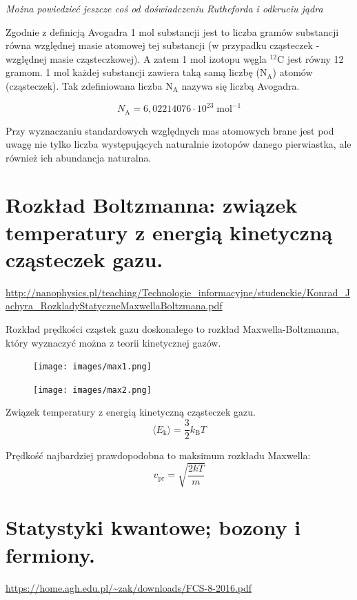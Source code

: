 \documentclass{article}
\begin{document}
\textit{Można powiedzieć jeszcze coś od doświadczeniu Rutheforda i odkruciu jądra}

Zgodnie z definicją Avogadra 1 mol substancji jest to liczba gramów substancji równa względnej masie atomowej tej substancji (w przypadku cząsteczek - względnej masie cząsteczkowej). A zatem 1 mol izotopu węgla ${}^{12}$C jest równy 12 gramom. 1 mol każdej substancji zawiera taką samą liczbę ($\mathrm{N_A}$) atomów (cząsteczek). Tak zdefiniowana liczba $\mathrm{N_A}$ nazywa się liczbą Avogadra.

\begin{equation*}
    N_\mathrm A  = 6{,}02214076 \cdot 10^{23} \; \mathrm{mol}^{-1}
\end{equation*}

Przy wyznaczaniu standardowych względnych mas atomowych brane jest pod uwagę nie tylko liczba występujących naturalnie izotopów danego pierwiastka, ale również ich abundancja naturalna.

\section{Rozkład Boltzmanna: związek temperatury z energią kinetyczną cząsteczek gazu.}

\url{http://nanophysics.pl/teaching/Technologie_informacyjne/studenckie/Konrad_Jachyra_RozkladyStatyczneMaxwellaBoltzmana.pdf}

Rozkład prędkości cząstek gazu doskonałego to rozkład Maxwella-Boltzmanna, który wyznaczyć można z teorii kinetycznej gazów.

\begin{figure}[H]
    \centering
\texttt{[image: images/max1.png]}
\end{figure}

\begin{figure}[H]
    \centering
\texttt{[image: images/max2.png]}
\end{figure}
Związek temperatury z energią kinetyczną cząsteczek gazu.
\begin{equation*}
    \langle E_\mathrm{k} \rangle = \frac{3}{2}k_\mathrm{B}T
\end{equation*}


Prędkość najbardziej prawdopodobna to maksimum rozkładu Maxwella:
\begin{equation*}
    v_\text{pr}=\sqrt{\frac{2kT}{m}}
\end{equation*}
\section{Statystyki kwantowe; bozony i fermiony.}
\url{https://home.agh.edu.pl/~zak/downloads/FCS-8-2016.pdf}
\end{document}

